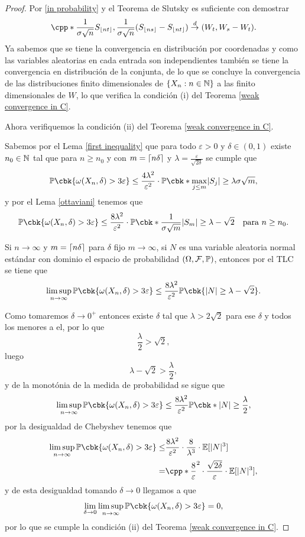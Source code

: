 \documentclass[12pt,oneside]{book}
\numberwithin{equation}{chapter}
\begin{document}
\begin{proof}
    Por \eqref{in probability} y el Teorema de Slutsky es suficiente con demostrar 
    \[
        \cpp*{\frac{1}{\sigma\sqrt{n}}S_{\floor{nt}},\frac{1}{\sigma\sqrt{n}}(S_{\floor{ns}}-S_{\floor{nt}})}\ar{d} (W_t,W_s-W_t).
    \]
    Ya sabemos que se tiene la convergencia en distribución por coordenadas y como las variables aleatorias en cada entrada son independientes también se tiene la convergencia en distribución de la conjunta, de lo que se concluye la convergencia de las distribuciones finito dimensionales de $\{X_n:n\in\N\}$ a las finito dimensionales de $W$, lo que verifica la condición (i) del Teorema \ref{weak convergence in C}.

    Ahora verifiquemos la condición (ii) del Teorema \ref{weak convergence in C}. 

    Sabemos por el Lema \ref{first inequality} que para todo $\varepsilon>0$ y $\delta\in (0,1)$ existe $n_0\in\N$ tal que para $n\geq n_0$ y con $m=\lceil n\delta\rceil$ y $\lambda=\frac{\varepsilon}{\sqrt{2\delta}}$ se cumple que
    \[
        \PP\cbk{\omega(X_n,\delta)>3\varepsilon}\leq \frac{4\lambda^2}{\varepsilon^2}\cdot\PP\cbk*{\max_{j\leq m}\abs{S_j}\geq\lambda\sigma\sqrt{m}},  
    \]
    y por el Lema \ref{ottaviani} tenemos que 
    \[
        \PP\cbk{\omega(X_n,\delta)>3\varepsilon}\leq \frac{8\lambda^2}{\varepsilon^2}\cdot \PP\cbk*{\frac{1}{\sigma\sqrt{m}}\abs{S_m}\geq \lambda-\sqrt{2}}\ \ \text{ para }n\geq n_0.
    \]

    Si $n\to\infty$ y $m=\lceil n\delta\rceil$ para $\delta$ fijo $m\to\infty$, si $N$ es una variable aleatoria normal estándar con dominio el espacio de probabilidad $\ofp$, entonces por el TLC se tiene que 
    \[
    \limsup_{n\to\infty}\PP\cbk{\omega(X_n,\delta)>3\varepsilon}\leq\frac{8\lambda^2}{\varepsilon^2}\PP\cbk{\abs{N}\geq\lambda-\sqrt{2}}.    
    \]
    
    Como tomaremos $\delta\to 0^+$ entonces existe $\delta$ tal que $\lambda>2\sqrt{2}$ para ese $\delta$ y todos los menores a el, por lo que 
    \[
        \frac{\lambda}{2}>\sqrt{2},
    \]
    luego 
    \[
        \lambda-\sqrt{2}>\frac{\lambda}{2},
    \]
    y de la monotónia de la medida de probabilidad se sigue que 
    \[
        \limsup_{n\to\infty}\PP\cbk{\omega(X_n,\delta)>3\varepsilon}\leq\frac{8\lambda^2}{\varepsilon^2}\PP\cbk*{\abs{N}\geq\frac{\lambda}{2}},
    \]
    por la desigualdad de Chebyshev tenemos que 
    \begin{align*}
        \limsup_{n\to\infty}\PP\cbk{\omega(X_n,\delta)>3\varepsilon}\leq& \frac{8\lambda^2}{\varepsilon^2}\cdot \frac{8}{\lambda^3}\cdot \EE[\abs{N}^3]\\ 
        =&\cpp*{\frac{8}{\varepsilon}}^2\cdot\frac{\sqrt{2\delta}}{\varepsilon}\cdot\EE[\abs{N}^3],
    \end{align*}
    y de esta desigualdad tomando $\delta\to 0$ llegamos a que
    \[
    \lim_{\delta\to 0}\limsup_{n\to\infty}\PP\cbk{\omega(X_n,\delta)>3\varepsilon}=0,
    \]
    por lo que se cumple la condición (ii) del Teorema \ref{weak convergence in C}.


\end{proof}
\end{document}
